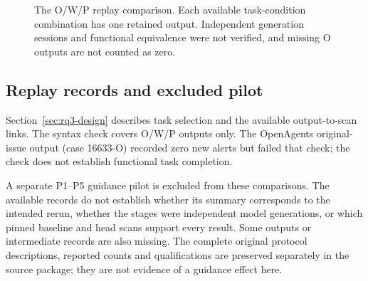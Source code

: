 \begin{figure}[H]
\centering
{}
\caption{The O/W/P replay comparison. Each available task-condition combination has one retained output. Independent generation sessions and functional equivalence were not verified, and missing O outputs are not counted as zero.}
\label{fig:rq3-method}
\end{figure}

\subsection*{Replay records and excluded pilot}

Section~\ref{sec:rq3-design} describes task selection and the available output-to-scan links. The syntax check covers O/W/P outputs only. The OpenAgents original-issue output (case 16633-O) recorded zero new alerts but failed that check; the check does not establish functional task completion.

A separate P1--P5 guidance pilot is excluded from these comparisons. The available records do not establish whether its summary corresponds to the intended rerun, whether the stages were independent model generations, or which pinned baseline and head scans support every result. Some outputs or intermediate records are also missing. The complete original protocol descriptions, reported counts and qualifications are preserved separately in the source package; they are not evidence of a guidance effect here.

